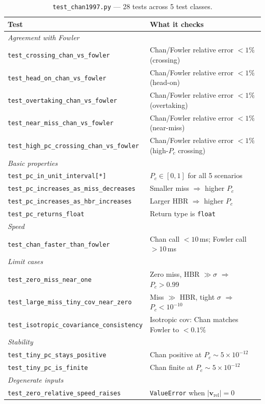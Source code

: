 \documentclass[11pt]{article}
\begin{document}
\begin{table}[htb]
\centering
\small
\caption{\texttt{test\_chan1997.py} — 28 tests across 5 test classes.}
\label{tab:test_chan}
\begin{tabular}{lp{10cm}}
  \toprule
  Test & What it checks \\
  \midrule
  \multicolumn{2}{l}{\textit{Agreement with Fowler}} \\
  \texttt{test\_crossing\_chan\_vs\_fowler} & Chan/Fowler relative error $< 1\%$ (crossing) \\
  \texttt{test\_head\_on\_chan\_vs\_fowler} & Chan/Fowler relative error $< 1\%$ (head-on) \\
  \texttt{test\_overtaking\_chan\_vs\_fowler} & Chan/Fowler relative error $< 1\%$ (overtaking) \\
  \texttt{test\_near\_miss\_chan\_vs\_fowler} & Chan/Fowler relative error $< 1\%$ (near-miss) \\
  \texttt{test\_high\_pc\_crossing\_chan\_vs\_fowler} & Chan/Fowler relative error $< 1\%$ (high-$P_c$ crossing) \\
  \midrule
  \multicolumn{2}{l}{\textit{Basic properties}} \\
  \texttt{test\_pc\_in\_unit\_interval[*]} & $P_c \in [0,1]$ for all 5 scenarios \\
  \texttt{test\_pc\_increases\_as\_miss\_decreases} & Smaller miss $\Rightarrow$ higher $P_c$ \\
  \texttt{test\_pc\_increases\_as\_hbr\_increases} & Larger HBR $\Rightarrow$ higher $P_c$ \\
  \texttt{test\_pc\_returns\_float} & Return type is \texttt{float} \\
  \midrule
  \multicolumn{2}{l}{\textit{Speed}} \\
  \texttt{test\_chan\_faster\_than\_fowler} & Chan call $< 10$\,ms; Fowler call $> 10$\,ms \\
  \midrule
  \multicolumn{2}{l}{\textit{Limit cases}} \\
  \texttt{test\_zero\_miss\_near\_one} & Zero miss, HBR $\gg \sigma$ $\Rightarrow$ $P_c > 0.99$ \\
  \texttt{test\_large\_miss\_tiny\_cov\_near\_zero} & Miss $\gg$ HBR, tight $\sigma$ $\Rightarrow$ $P_c < 10^{-10}$ \\
  \texttt{test\_isotropic\_covariance\_consistency} & Isotropic cov: Chan matches Fowler to $< 0.1\%$ \\
  \midrule
  \multicolumn{2}{l}{\textit{Stability}} \\
  \texttt{test\_tiny\_pc\_stays\_positive} & Chan positive at $P_c \sim 5\times10^{-12}$ \\
  \texttt{test\_tiny\_pc\_is\_finite} & Chan finite at $P_c \sim 5\times10^{-12}$ \\
  \midrule
  \multicolumn{2}{l}{\textit{Degenerate inputs}} \\
  \texttt{test\_zero\_relative\_speed\_raises} & \texttt{ValueError} when $|\mathbf{v}_\text{rel}|=0$ \\
  \bottomrule
\end{tabular}
\end{table}
\end{document}
